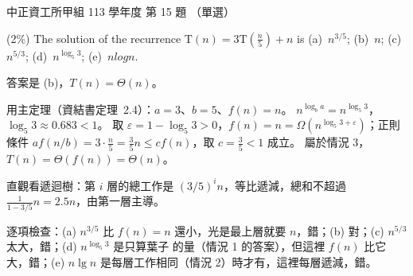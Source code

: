 \begin{pastexam}[label={px:ccu-113-swa-10}]{中正資工所甲組 113 學年度 第 15 題}
（單選）

(2\%) The solution of the recurrence $\mathrm{T}(n)=3\mathrm{T}\left(\frac{n}{5}\right)+n$ is \quad (a)~$n^{3/5}$; (b)~$n$; (c)~$n^{5/3}$; (d)~$n^{\log_5 3}$; (e)~$nlogn$.
\end{pastexam}

\begin{pastsoln}
答案是 (b)，$T(n) = \Theta(n)$。

用主定理（資結書定理~2.4）：$a = 3$、$b = 5$、$f(n) = n$。 $n^{\log_b a} = n^{\log_5 3}$，$\log_5 3 \approx 0.683 < 1$。
取 $\varepsilon = 1 - \log_5 3 > 0$，$f(n) = n = \Omega(n^{\log_5 3 + \varepsilon})$；正則條件
$a f(n/b) = 3 \cdot \frac{n}{5} = \frac{3}{5} n \le c f(n)$，取 $c = \frac{3}{5} < 1$ 成立。 屬於情況 3，$T(n) = \Theta(f(n)) = \Theta(n)$。

直觀看遞迴樹：第 $i$ 層的總工作是 $(3/5)^i n$，等比遞減，總和不超過 $\frac{1}{1 - 3/5} n = 2.5n$，由第一層主導。

逐項檢查：(a) $n^{3/5}$ 比 $f(n) = n$ 還小，光是最上層就要 $n$，錯；(b) 對；(c) $n^{5/3}$ 太大，錯；(d) $n^{\log_5 3}$ 是只算葉子
的量（情況 1 的答案），但這裡 $f(n)$ 比它大，錯；(e) $n \lg n$ 是每層工作相同（情況 2）時才有，這裡每層遞減，錯。
\end{pastsoln}
